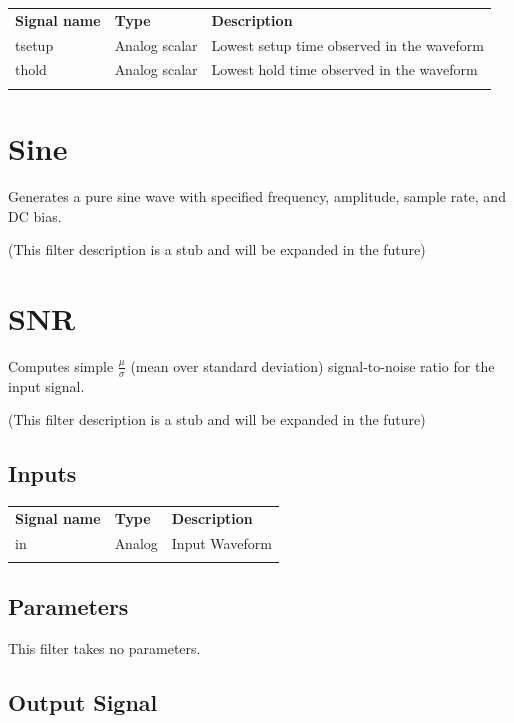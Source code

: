 \begin{tabularx}{16cm}{llX}
\thickhline
\textbf{Signal name} & \textbf{Type} & \textbf{Description} \\
\thickhline
tsetup & Analog scalar & Lowest setup time observed in the waveform\\
\thinhline
thold & Analog scalar & Lowest hold time observed in the waveform\\
\thickhline
\end{tabularx}

\pagebreak
\section{Sine}

Generates a pure sine wave with specified frequency, amplitude, sample rate, and DC bias.

(This filter description is a stub and will be expanded in the future)

\pagebreak
\section{SNR}
Computes simple $\frac{\mu}{\sigma}$ (mean over standard deviation) signal-to-noise ratio for the input signal.

(This filter description is a stub and will be expanded in the future)

\subsection{Inputs}

\begin{tabularx}{16cm}{llX}
\thickhline
\textbf{Signal name} & \textbf{Type} & \textbf{Description} \\
\thickhline
in & Analog & Input Waveform \\
\thickhline
\end{tabularx}

\subsection{Parameters}

This filter takes no parameters.

\subsection{Output Signal}

